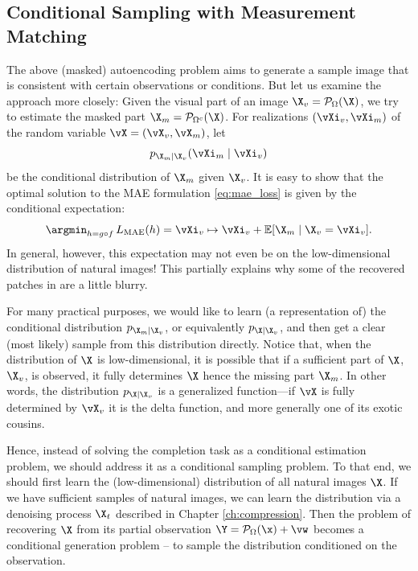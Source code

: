 \documentclass[../../book-main.tex]{subfiles}
\begin{document}
\subsection{Conditional Sampling with Measurement Matching}
\label{sec:conditioned-decoding}
The above (masked) autoencoding problem aims to generate a sample image that is consistent with certain observations or conditions. But let us examine the approach more closely: Given the
visual part of an image $\X_v = \mathcal{P}_{\Omega}(\X)$, we try to
estimate the masked part $\X_m = \mathcal{P}_{\Omega^c}(\X)$. For realizations
$(\vXi_v, \vXi_m)$ of the random variable $\vX=(\vX_v, \vX_m)$, let
\[p_{\X_m \mid \X_v}(\vXi_m\mid \vXi_v)\]
be the conditional distribution of $\X_m$ given
$\X_v$. It is easy to show that the optimal solution to the  MAE
formulation \eqref{eq:mae_loss} is given by the conditional expectation:
\begin{equation}
  \argmin_{h = g \circ f}\, L_{\mathrm{MAE}}(h)
  = \vXi_v \mapsto \vXi_v + \mathbb{E}[\X_m \mid \X_v=\vXi_v].
\end{equation}
In general, however, this expectation may not even be on the
low-dimensional distribution of natural images! This partially
explains why some of the recovered patches in 
are a little blurry.

For many practical purposes, we would like to learn (a representation
of) the conditional distribution $p_{\X_m \mid \X_v}$, or equivalently
$p_{\X \mid \X_v}$,
and then get a clear (most likely) sample from this distribution directly. Notice that, when the distribution of $\X$ is low-dimensional, it is possible that if a
sufficient part of $\X$, $\X_v$, is observed, it fully determines
$\X$ hence the missing part $\X_m$. In other words, the distribution
$p_{\X \mid \X_v}$ is a generalized function---if $\vX$ is fully determined by $\vX_v$ it is the delta function, and more generally one of its exotic cousins.

Hence, instead of solving the completion task as a conditional estimation problem, we should address it as a conditional sampling problem. To that end, we should first learn the (low-dimensional) distribution of all natural images $\X$. If we have sufficient samples of natural images, we can learn the distribution via a denoising process $\X_t$ described in Chapter \ref{ch:compression}. Then the problem of recovering $\X$ from its partial observation $\Y = \mathcal{P}_\Omega(\x) +\vw$ becomes a conditional generation problem -- to sample the distribution conditioned on the observation.
\end{document}
